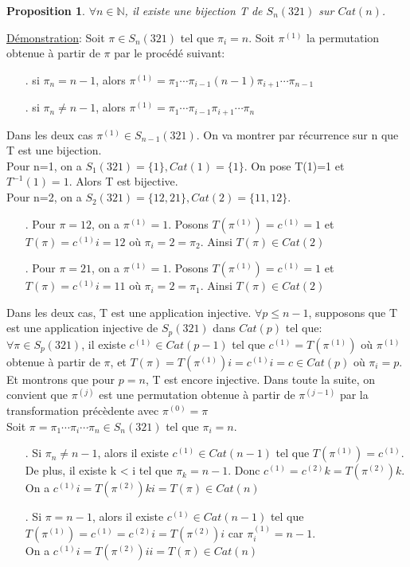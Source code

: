 \documentclass[12pt,a4paper]{extreport}
\newtheorem{proposition}{Proposition}[chapter]
\begin{document}
	\begin{proposition}
		$\forall n \in \mathbb{N}$, il existe une bijection T de $S_{n}(321)$ sur $Cat(n)$. 
	\end{proposition}
		\underline{Démonstration}:
			Soit $\pi \in S_{n}(321)$ tel que $\pi_{i} = n$. Soit $\pi^{(1)}$ la permutation obtenue à partir de $\pi$ par le procédé suivant:
			\begin{itemize}
				\item[.] si $\pi_{n} = n-1$, alors $\pi^{(1)} = \pi_{1} \cdots \pi_{i-1}(n-1)
						\pi_{i+1} \cdots \pi_{n-1} $
				\item[.] si $\pi_{n} \neq n-1 $, alors $\pi^{(1)} = \pi_{1} \cdots \pi_{i-1}
				\pi_{i+1} \cdots \pi_{n} $
			\end{itemize}
			Dans les deux cas $\pi^{(1)} \in S_{n-1}(321)$. On va montrer par récurrence sur n que T est une bijection.\\
			Pour n=1, on a $S_{1}(321)=\{1\}, Cat(1)=\{1\}$. On pose T(1)=1 et $ T^{-1}(1) = 1 $. Alors T est bijective.\\
			Pour n=2, on a $S_{2}(321)=\{12, 21\}, Cat(2)=\{11, 12\}$.\\
			\begin{itemize}
				\item[.] Pour $\pi = 12$, on a $\pi^{(1)} = 1$. Posons $T(\pi^{(1)}) = c^{(1)}=1 $ et  $T(\pi) = c^{(1)}i  = 12 $ où $\pi_{i} = 2 = \pi_{2}$. Ainsi $T(\pi) \in Cat(2)$
				\item[.] Pour $\pi = 21$, on a $\pi^{(1)} = 1$. Posons $T(\pi^{(1)}) = c^{(1)}=1 $ et  $T(\pi) = c^{(1)}i  = 11 $ où $\pi_{i} = 2 = \pi_{1}$. Ainsi $T(\pi) \in Cat(2)$
			\end{itemize}
			Dans les deux cas, T est une application injective. $\forall p\leq n-1$, supposons que T est une application injective de $S_{p}(321)$ dans $Cat(p)$ tel que:\\
			$\forall \pi \in S_{p}(321)$, il existe $c^{(1)} \in Cat(p-1) $ tel que $ c^{(1)} = T(\pi^{(1)}) $ où $\pi^{(1)}$ obtenue à partir de $\pi$, et
			$T(\pi) = T(\pi^{(1)})i = c^{(1)}i = c \in Cat(p)$ où $\pi_{i} = p$. Et montrons que pour $p=n$, T est encore injective. Dans toute la suite, on convient que $\pi^{(j)} $ est une permutation obtenue à partir de $\pi^{(j-1)}$ par la transformation précèdente avec $\pi^{(0)} = \pi$\\
			Soit $\pi = \pi_{1} \cdots \pi_{i} \cdots  \pi_{n} \in S_{n}(321) $ tel que $ \pi_{i} = n$.
			\begin{itemize}
				\item[.] Si $\pi_{n} \neq n-1 $, alors il existe $c^{(1)} \in Cat(n-1)$ tel  que $T(\pi^{(1)}) = c^{(1)} $.\\
				De plus, il existe k < i tel que $\pi_{k} = n-1$. Donc $c^{(1)}=c^{(2)}k=T(\pi^{(2)})k $.\\
				On a $ c^{(1)}i = T(\pi^{(2)})ki = T(\pi) \in Cat(n) $
				\item[.] Si $\pi = n-1 $, alors il existe $c^{(1)} \in Cat(n-1)$ tel  que $T(\pi^{(1)}) = c^{(1)} = c^{(2)}i = T(\pi^{(2)})i $ car $\pi^{(1)}_{i}=n-1$.\\
				On a $ c^{(1)}i = T(\pi^{(2)})ii = T(\pi) \in Cat(n)$
			\end{itemize}
\end{document}
